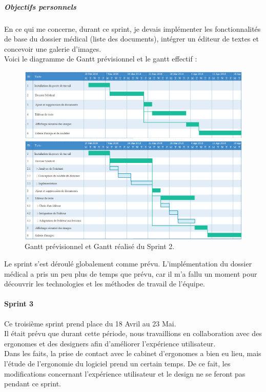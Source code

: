 \subparagraph{Objectifs personnels}
En ce qui me concerne, durant ce sprint, je devais implémenter les fonctionnalités de base du dossier médical (liste des documents), intégrer un éditeur de textes et concevoir une galerie d'images.\\
Voici le diagramme de Gantt prévisionnel et le gantt effectif : 
\begin{figure}[H]
  \centering
  \centerline{\includegraphics[width=20.5cm]{./img/gantt_sprint2}}
  \caption{\label{fig:mb_va_ast} Gantt prévisionnel et Gantt réalisé du Sprint 2.}
\end{figure}
Le sprint s'est déroulé globalement comme prévu. L'implémentation du dossier médical a pris un peu plus de temps que prévu, car il m'a fallu un moment pour découvrir les technologies et les méthodes de travail de l'équipe.

\newpage
\paragraph*{Sprint 3\\}
Ce troisième sprint prend place du 18 Avril au 23 Mai.\\ 
Il était prévu que durant cette période, nous travaillions en collaboration avec des ergonomes et des designers afin d'améliorer l'expérience utilisateur. \\
Dans les faits, la prise de contact avec le cabinet d'ergonomes a bien eu lieu, mais l'étude de l'ergonomie du logiciel prend un certain temps. De ce fait, les modifications concernant l'expérience utilisateur et le design ne se feront pas pendant ce sprint.

